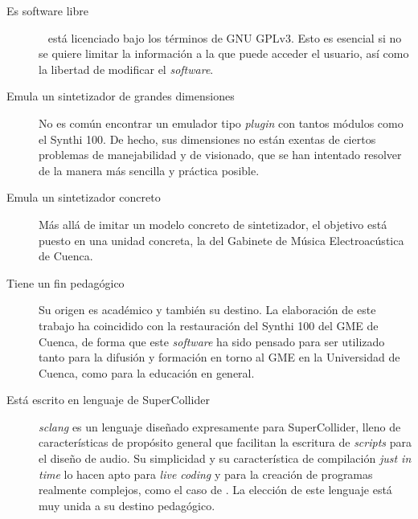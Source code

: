 \begin{description}
	\item[Es software libre] \appName~ está licenciado bajo los términos de GNU GPLv3. Esto es esencial si no se quiere limitar la información a la que puede acceder el usuario, así como la libertad de modificar el \textit{software}. 
	
	\item[Emula un sintetizador de grandes dimensiones] No es común encontrar un emulador tipo \textit{plugin} con tantos módulos como el Synthi 100. De hecho, sus dimensiones no están exentas de ciertos problemas de manejabilidad y de visionado, que se han intentado resolver de la manera más sencilla y práctica posible.
	
	\item[Emula un sintetizador concreto] Más allá de imitar un modelo concreto de sintetizador, el objetivo está puesto en una unidad concreta, la del Gabinete de Música Electroacústica de Cuenca. 
	
	\item[Tiene un fin pedagógico] Su origen es académico y también su destino. La elaboración de este trabajo ha coincidido con la restauración del Synthi 100 del GME de Cuenca, de forma que este \textit{software} ha sido pensado para ser utilizado tanto para la difusión y formación en torno al GME en la Universidad de Cuenca, como para la educación en general. 
	
	\item[Está escrito en lenguaje de SuperCollider] \textit{sclang} es un lenguaje diseñado expresamente para SuperCollider, lleno de características de propósito general que facilitan la escritura de \textit{scripts} para el diseño de audio. Su simplicidad y su característica de compilación \textit{just in time} lo hacen apto para \textit{live coding} y para la creación de programas realmente complejos, como el caso de \appName. La elección de este lenguaje está muy unida a su destino pedagógico.
\end{description}



